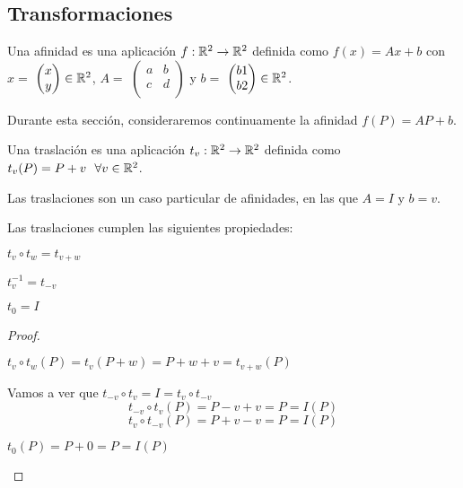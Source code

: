 \subsection{Transformaciones}

\begin{ndef}[Afinidades]
  Una afinidad es una aplicación $f : \mathbb{R}^2 \rightarrow \mathbb{R}^2$ definida como $f(x) = Ax + b$ con $x =$ $\begin{pmatrix}
    x\\
    y\\
  \end{pmatrix} \in \mathbb{R}^2$, $A =$ $\begin{pmatrix}
    a & b\\
    c & d\\
  \end{pmatrix}$
  y $b =$ $\begin{pmatrix}
    b1\\
    b2\\
  \end{pmatrix} \in \mathbb{R}^2$.
\end{ndef}

\begin{nota}
  Durante esta sección, consideraremos continuamente la afinidad $f(P) = AP + b $.
\end{nota}

\begin{ndef}[Traslaciones]
  Una traslación es una aplicación $t_v: \mathbb{R}^2 \rightarrow \mathbb{R}^2$ definida como $t_v(P) = P + v \ \ \forall v \in \mathbb{R}^2$.
\end{ndef}

\begin{ncor}
    \item Las traslaciones son un caso particular de afinidades, en las que $A = I$ y $b = v$.
\end{ncor}

\begin{nprop}
  Las traslaciones cumplen las siguientes propiedades:
  \begin{nlist}
  \item $\displaystyle t_v \circ t_w = t_{v+w}$
  \item $t_{v}^{-1} = t_{-v}$
  \item $t_0 = I$
  \end{nlist}
\end{nprop}
\begin{proof}\hfill
  \begin{nlist}
  \item $t_v \circ t_w (P) = t_v(P+w) = P+w+v = t_{v+w}(P)$
  \item Vamos a ver que $t_{-v}\circ t_v = I = t_v \circ t_{-v}$
    $$
    t_{-v}\circ t_v (P) = P-v+v = P = I(P)$$
    $$t_v\circ t_{-v}(P) = P+v-v = P = I(P)
    $$
  \item $t_0(P) = P +0 = P = I(P)$
  \end{nlist}
\end{proof}

